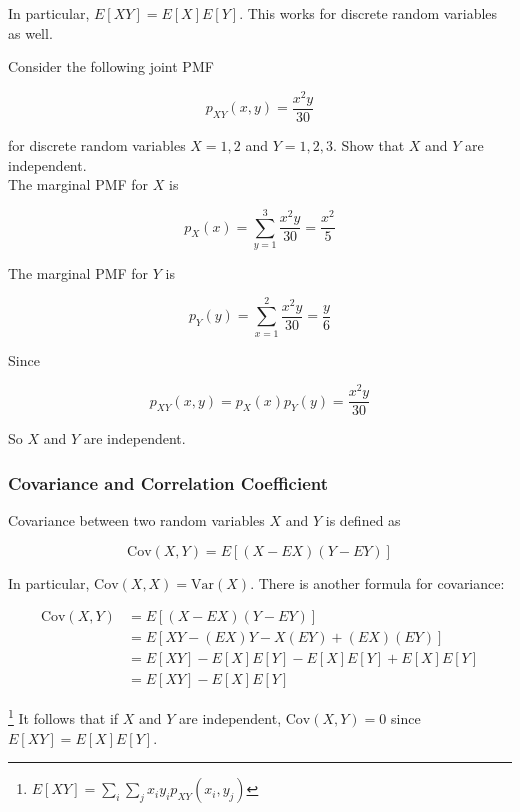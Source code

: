 \documentclass[12pt, a4paper]{article}
\newcounter{exa}
\begin{document}
In particular, $E[XY]=E[X]E[Y]$. This works for discrete random variables as well.

\begin{texample}
Consider the following joint PMF

\[ p_{XY}(x,y)=\frac{x^2y}{30} \]

for discrete random variables $X=1,2$ and $Y=1,2,3$. Show that $X$ and $Y$ are independent. \\

The marginal PMF for $X$ is

\[p_X(x)=\sum_{y=1}^3 \frac{x^2y}{30} = \frac{x^2}{5}\]

The marginal PMF for $Y$ is

\[p_Y(y)=\sum_{x=1}^2 \frac{x^2y}{30} = \frac{y}{6}\]

Since

\[p_{XY}(x,y)=p_X(x)p_Y(y)=\frac{x^2y}{30}\]

So $X$ and $Y$ are independent.
\end{texample}

\subsubsection{Covariance and Correlation Coefficient}

Covariance between two random variables $X$ and $Y$ is defined as

\[ \text{Cov}(X,Y)=E[(X-EX)(Y-EY)] \]

In particular, $\text{Cov}(X,X)=\text{Var}(X)$. There is another formula for covariance:

\begin{align*}
\text{Cov}(X,Y)&=E[(X-EX)(Y-EY)] \\
&=E[XY-(EX)Y-X(EY)+(EX)(EY)] \\
&=E[XY]-E[X]E[Y]-E[X]E[Y]+E[X]E[Y] \\
&=E[XY]-E[X]E[Y]
\end{align*}

\footnote{$\displaystyle E[XY]=\sum_i \sum_j x_iy_ip_{XY}(x_i,y_j)$} It follows that if $X$ and $Y$ are independent, $\text{Cov}(X,Y)=0$ since $E[XY]=E[X]E[Y]$.
\end{document}
